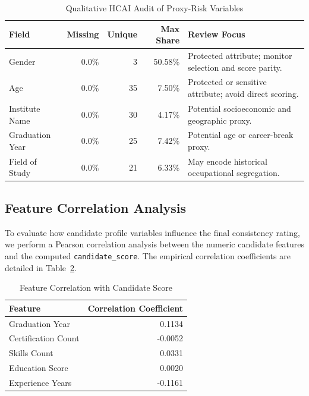 \documentclass[sigconf]{acmart}
\begin{document}
\begin{table}[h]
\centering
\scriptsize
\setlength{\tabcolsep}{3pt}
\caption{Qualitative HCAI Audit of Proxy-Risk Variables}
\label{tab:hcai_audit}
\begin{tabular}{lrrrp{2.5cm}}
\toprule
\textbf{Field} & \textbf{Missing} & \textbf{Unique} & \textbf{Max Share} & \textbf{Review Focus} \\
\midrule
Gender & 0.0\% & 3 & 50.58\% & Protected attribute; monitor selection and score parity. \\
Age & 0.0\% & 35 & 7.50\% & Protected or sensitive attribute; avoid direct scoring. \\
Institute Name & 0.0\% & 30 & 4.17\% & Potential socioeconomic and geographic proxy. \\
Graduation Year & 0.0\% & 25 & 7.42\% & Potential age or career-break proxy. \\
Field of Study & 0.0\% & 21 & 6.33\% & May encode historical occupational segregation. \\
\bottomrule
\end{tabular}
\end{table}\subsection{Feature Correlation Analysis}
To evaluate how candidate profile variables influence the final consistency rating, we perform a Pearson correlation analysis between the numeric candidate features and the computed \texttt{candidate\_score}. The empirical correlation coefficients are detailed in Table~\ref{tab:correlations}.

\begin{table}[h]
\centering
\caption{Feature Correlation with Candidate Score}
\label{tab:correlations}
\begin{tabular}{lr}
\toprule
\textbf{Feature} & \textbf{Correlation Coefficient} \\
\midrule
Graduation Year & 0.1134 \\
Certification Count & -0.0052 \\
Skills Count & 0.0331 \\
Education Score & 0.0020 \\
Experience Years & -0.1161 \\
\bottomrule
\end{tabular}
\end{table}
\end{document}
